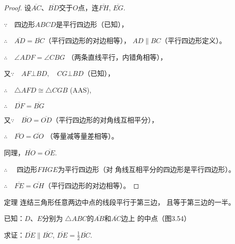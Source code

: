 \begin{proof}
    设$\overline{AC}$、$\overline{BD}$交于$O$点，连$\overline{FH}$, $\overline{EG}$.

$\because\quad $四边形$ABCD$是平行四边形（已知），

$\therefore\quad \overline{AD}=\overline{BC}$（平行四边形的对边相等），
$AD\parallel BC$（平行四边形定义）。

$\therefore\quad \angle ADF=\angle CBG$ （两条直线平行，内错角相等），

又$\because\quad AF\bot BD,\quad CG\bot BD$（已知），

$\therefore\quad \triangle AFD\cong \triangle CGB$ (AAS),

$\therefore\quad \overline{DF}=\overline{BG}$

又$\because\quad \overline{BO}=\overline{OD}$（平行四边形的对角线互相平分），

$\therefore\quad \overline{FO}=\overline{GO}$ （等量减等量差相等）。

同理，$\overline{HO}=\overline{OE}$.

$\therefore\quad$ 四边形$FHGE$为平行四边形（对
角线互相平分的四边形是平行四边形）。

$\therefore\quad \overline{FE}=\overline{GH}$（平行四边形的对边相等）。
\end{proof}

\begin{blk}
{定理} 连结三角形任意两边中点的线段平行于第三边，
且等于第三边的一半。    
\end{blk}

已知：$D$、$E$分别为
$\triangle ABC$的$\overline{AB}$和$\overline{AC}$边上
的中点（图3.54）

求证：$\overline{DE}\parallel \overline{BC}$, $\overline{DE}=\frac{1}{2}\overline{BC}$.

\begin{figure}[htp]
    \centering
{}
    \caption{}
\end{figure}

